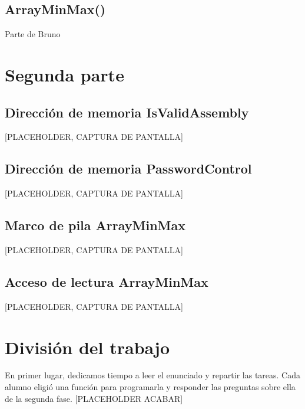 \documentclass{article}
\begin{document}
\subsection{ArrayMinMax()}
Parte de Bruno

\newpage
\section{Segunda parte}
\subsection{Dirección de memoria IsValidAssembly}
[PLACEHOLDER, CAPTURA DE PANTALLA]

\subsection{Dirección de memoria PasswordControl}
[PLACEHOLDER, CAPTURA DE PANTALLA]

\subsection{Marco de pila ArrayMinMax}
[PLACEHOLDER, CAPTURA DE PANTALLA]

\subsection{Acceso de lectura ArrayMinMax}
[PLACEHOLDER, CAPTURA DE PANTALLA]

\newpage

\section{División del trabajo}
\hspace{1mm} En primer lugar, dedicamos tiempo a leer el enunciado y repartir las tareas.
Cada alumno eligió una función para programarla y responder las preguntas sobre ella
de la segunda fase.
[PLACEHOLDER ACABAR]
\end{document}
